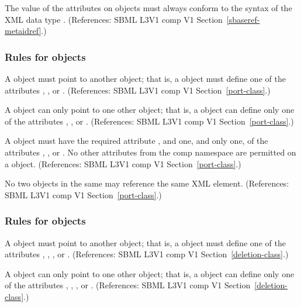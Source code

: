 \begin{sbmlenum}
 { The value of the  attributes on
  \SBaseRef objects must always conform to the syntax of the XML data
  type .
  (References: SBML L3V1 comp V1 Section~\ref{sbaseref-metaidref}.) }


\end{sbmlenum} \subsubsection*{Rules for  objects} \begin{sbmlenum}

 { A \Port object must point to another object; that is,
  a \Port object must define one of the attributes 
  , , or . 
  (References: SBML L3V1 comp V1 Section~\ref{port-class}.) }


 { A \Port object can only point to one other object; that is,
  a \Port object can define only one of the attributes 
  , , or .
  (References: SBML L3V1 comp V1 Section~\ref{port-class}.) }


 { A \Port object must have the
  required attribute , and one, and only one, of the attributes  
  , , or .
  No other attributes from the comp namespace are permitted on a
  \Port object.
  (References: SBML L3V1 comp V1 Section~\ref{port-class}.) }


 { No two \Port objects in the same \Model may
  reference the same XML element.
  (References: SBML L3V1 comp V1 Section~\ref{port-class}.) }

\end{sbmlenum} \subsubsection*{Rules for  objects} \begin{sbmlenum}

 { A \Deletion object must point to another object; that is,
  a \Deletion object must define one of the attributes , 
  , , or . 
  (References: SBML L3V1 comp V1 Section~\ref{deletion-class}.) }


 { A \Deletion object can only point to one other object; that is,
  a \Deletion object can define only one of the attributes  , 
  , , or .
  (References: SBML L3V1 comp V1 Section~\ref{deletion-class}.) }



\end{sbmlenum}
